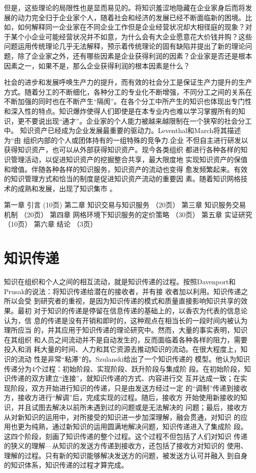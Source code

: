 \documentclass[12pt,a4paper]{Ctexart}
\begin{document}
但是，这些理论的局限性也是显而易见的。将知识羞涩地隐藏在企业家身后而将发展的动力完全归于企业家个人，随着社会和经济的发展已经不断面临新的困境。比如，如何解释同一企业家在不同企业工作但是企业经营状况却大相径庭的现象？对于某个小企业可能经营状况并不如意，为什么会有大企业愿意花大价钱并购？这些问题运用传统理论几乎无法解释，预示着传统理论的固有缺陷并提出了新的理论问题，除了企业家之外，还有哪些因素是企业获得利润的因素？企业家是否还是根本因素之一，如果不是，那么企业获得利润的根本因素是什么？

社会的进步和发展呼唤生产力的提升，而有效的社会分工是保证生产力提升的生产方式。随着分工的不断细化，各种分工的专业化不断增强，不同分工之间的关系在不断加强的同时也在不断产生“隔阂”。在各个分工中所产生的知识也体现出专门性和深入性的特点。知识爆炸使得人们即使是在本专业内也难以学习掌握所有的知识，更不要说出现“通才”。企业家的个人能力被越来越限制在一个狭窄的社会分工中。
知识资产已经成为企业发展最重要的驱动力。Leventhal和March将其描述为“由
组织内部的个人或团体持有的一组特殊的竞争力\cite{levinthal1993ml}.企业
不但自主进行研发以获得知识资产，也可以从外部获得知识资产。现今各类组织
都进行各种各样的知识管理活动，以促进知识资产的挖掘整合共享，最大限度地
实现知识资产的保值和增值。伴随各种各样的知识服务，知识资产的流动也变得
愈发频繁起来。有效的知识管理方式和恰当的制度是促进知识资产流动的重要因
素。随着知识网格技术的成熟和发展，出现了知识集市 。\cite{Andreas2007}

第一章	引言 (10页)
第二章	知识交易与知识服务 （20页）
第三章	知识服务交易机制  （20页）
第四章	网格环境下知识服务的定价策略 （30页）
第五章	实证研究 （10页）
第六章	结论  （3页）

\section{知识传递}
知识在组织和个人之间的相互流动，就是知识传递的过程。按照Davenport和
Prusak\cite{davenport1998wko}的说法：将知识传递给潜在的接收者，并有接
收者加以利用。知识传递之所以会受
到研究者的重视，是因为知识传递的模式和质量直接影响知识共享的效果。最初
对于知识的传递是停留在信息传递的基础上的，以香农\cite{Shannon1949}为代表的信息论认为，信
息的传递是没有开销和即时的，这种观点在相当长的一段时间内被认为理所应当
的，并其应用于知识传递的理论研究中。然而，大量的事实表明，知识在其组织
和人员之间流动并不是自动发生的，反而面临着各种各样的阻力，需要投入和消
耗大量的时间、人力和其它资源去推动知识的流动。在很大程度上，知识的流动
性是非常“粘滞”的。Szulanski\cite{szulanski2000pkt}给出了一个知识传递的
模型。他认为知识传递分为4个过程：初始阶段、实现阶段、跃升阶段与集成阶
段。在初始阶段，知识传递的双方建立“连接”，就知识传递的方式、内容进行交
互并达成一致；在实现阶段，双方开始进行知识的传递，只是由发送方经过一定
的“调制”传递到接收方，接收方进行“解调”后，完成实现的过程。随后，接收方
开始使用新接收的知识，并且试图去解决以前所未遇到过的问题或是无法解决的
问题；最后，接收方从对新知识的运用中，对所接受的知识进一步加深理解，融会贯通，对知识
的应用也更为纯熟，通过新知识的运用圆满地解决问题，知识传递进入了集成阶
段。这四个阶段，刻画了知识传递的整个过程。这个过程不但包括了人们对知识
传递的狭义的理解---从知识的发送方传递到接收方，还包括了接收方对知识的
使用、理解的过程。只有新的知识能够解决发送方的问题，被发送方认可并融入
到自身的知识体系，知识传递的过程才算完成。
\end{document}

